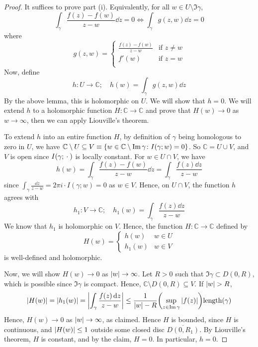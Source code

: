 \begin{proof}
	It suffices to prove part (i).
	Equivalently, for all \( w \in U \setminus \Im \gamma \),
	\[
		\int_\gamma \frac{f(z) - f(w)}{z-w} \dd{z} = 0 \iff \int_\gamma g(z,w) \dd{z} = 0
	\]
	where
	\[
		g(z,w) = \begin{cases}
			\frac{f(z) - f(w)}{z-w} & \text{if } z \neq w \\
			f'(w)                   & \text{if } z = w    \\
		\end{cases}
	\]
	Now, define
	\[
		h \colon U \to \mathbb C;\quad h(w) = \int_\gamma g(z,w) \dd{z}
	\]
	By the above lemma, this is holomorphic on \( U \).
	We will show that \( h = 0 \).
	We will extend \( h \) to a holomorphic function \( H \colon \mathbb C \to \mathbb C \) and prove that \( H(w) \to 0 \) as \( w \to \infty \), then we can apply Liouville's theorem.

	To extend \( h \) into an entire function \( H \), by definition of \( \gamma \) being homologous to zero in \( U \), we have \( \mathbb C \setminus U \subseteq V \equiv \qty{w \in \mathbb C \setminus \operatorname{Im}\gamma \colon I(\gamma;w) = 0 } \).
	So \( \mathbb C = U \cup V \), and \( V \) is open since \( I(\gamma;{}\cdot{}) \) is locally constant.
	For \( w \in U \cap V \), we have
	\[
		h(w) = \int_\gamma \frac{f(z) - f(w)}{z-w} \dd{z} = \int_\gamma \frac{f(z) \dd{z}}{z-w}
	\]
	since \( \int_\gamma \frac{\dd{z}}{z-w} = 2\pi i \cdot I(\gamma;w) = 0 \) as \( w \in V \).
	Hence, on \( U \cap V \), the function \( h \) agrees with
	\[
		h_1 \colon V \to \mathbb C;\quad h_1(w) = \int_\gamma \frac{f(z) \dd{z}}{z-w}
	\]
	We know that \( h_1 \) is holomorphic on \( V \).
	Hence, the function \( H \colon \mathbb C \to \mathbb C \) defined by
	\[
		H(w) = \begin{cases}
			h(w)   & w \in U \\
			h_1(w) & w \in V
		\end{cases}
	\]
	is well-defined and holomorphic.

	Now, we will show \( H(w) \to 0 \) as \( \abs{w} \to \infty \).
	Let \( R > 0 \) such that \( \Im \gamma \subset D(0,R) \), which is possible since \( \Im \gamma \) is compact.
	Hence, \( \mathbb C \setminus D(0,R) \subseteq V \).
	If \( \abs{w} > R \),
	\[
		\abs{H(w)} = \abs{h_1(w)} = \abs{\int_\gamma \frac{f(z) \dd{z}}{z-w}} \leq \frac{1}{\abs{w} - R} \qty( \sup_{z \in \operatorname{Im} \gamma} \abs{f(z)} ) \mathrm{length}(\gamma)
	\]
	Hence, \( H(w) \to 0 \) as \( \abs{w} \to \infty \), as claimed.
	Hence \( H \) is bounded, since \( H \) is continuous, and \( \abs{H(w)} \leq 1 \) outside some closed disc \( \overline{D(0,R_1)} \).
	By Liouville's theorem, \( H \) is constant, and by the claim, \( H = 0 \).
	In particular, \( h = 0 \).
\end{proof}
